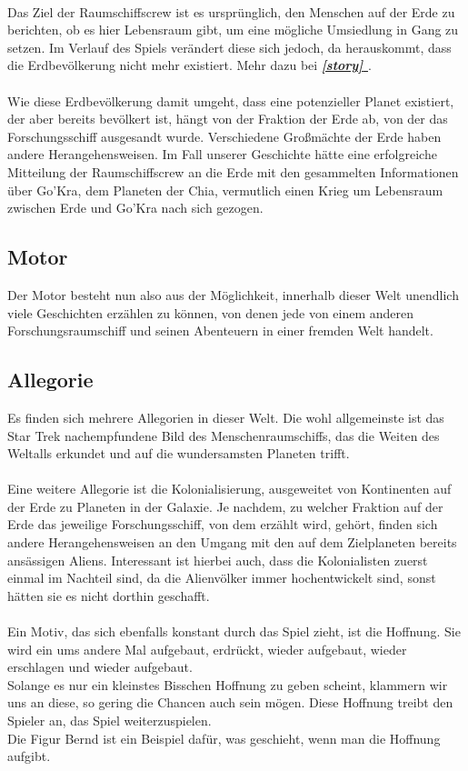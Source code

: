 \documentclass[12pt]{article}
\begin{document}
	\\
	Das Ziel der Raumschiffscrew ist es ursprünglich, den Menschen auf der Erde zu berichten, ob es hier Lebensraum gibt, um eine mögliche Umsiedlung in Gang zu setzen. Im Verlauf des Spiels verändert diese sich jedoch, da herauskommt, dass die Erdbevölkerung nicht mehr existiert. Mehr dazu bei \textbf{\textit{\hyperref[story]{\ref{story} }}}.\\
	\\
	Wie diese Erdbevölkerung damit umgeht, dass eine potenzieller Planet existiert, der aber bereits bevölkert ist,
	hängt von der Fraktion der Erde ab, von der das Forschungsschiff ausgesandt wurde. Verschiedene Großmächte
	der Erde haben andere Herangehensweisen. Im Fall unserer Geschichte hätte eine erfolgreiche Mitteilung
	der Raumschiffscrew an die Erde mit den gesammelten Informationen über Go’Kra, dem Planeten der Chia,
	vermutlich einen Krieg um Lebensraum zwischen Erde und Go’Kra nach sich gezogen.
	
	
	\subsection{Motor}
	Der Motor besteht nun also aus der Möglichkeit, innerhalb dieser Welt unendlich viele Geschichten erzählen zu können, von denen jede von einem anderen Forschungsraumschiff und seinen Abenteuern in einer fremden Welt handelt.
	
	
	\subsection{Allegorie}\label{All.}
	Es finden sich mehrere Allegorien in dieser Welt. Die wohl allgemeinste ist das Star Trek nachempfundene Bild des Menschenraumschiffs, das die Weiten des Weltalls erkundet und auf die wundersamsten Planeten trifft.\\
	\\
	Eine weitere Allegorie ist die Kolonialisierung, ausgeweitet von Kontinenten auf der Erde zu Planeten in der Galaxie. Je nachdem, zu welcher Fraktion auf der Erde das jeweilige Forschungsschiff, von dem erzählt wird,
	gehört, finden sich andere Herangehensweisen an den Umgang mit den auf dem Zielplaneten bereits ansässigen
	Aliens. Interessant ist hierbei auch, dass die Kolonialisten zuerst einmal im Nachteil sind, da die Alienvölker
	immer hochentwickelt sind, sonst hätten sie es nicht dorthin geschafft.\\
	\\
	Ein Motiv, das sich ebenfalls konstant durch das Spiel zieht, ist die Hoffnung. Sie wird ein ums andere Mal aufgebaut, erdrückt, wieder aufgebaut, wieder erschlagen und wieder aufgebaut.\\
	Solange es nur ein kleinstes Bisschen Hoffnung zu geben scheint, klammern wir uns an diese, so gering die Chancen auch sein mögen. Diese Hoffnung treibt den Spieler an, das Spiel weiterzuspielen.\\
	Die Figur Bernd ist ein Beispiel dafür, was geschieht, wenn man die Hoffnung aufgibt.\\
	\newpage
\end{document}
